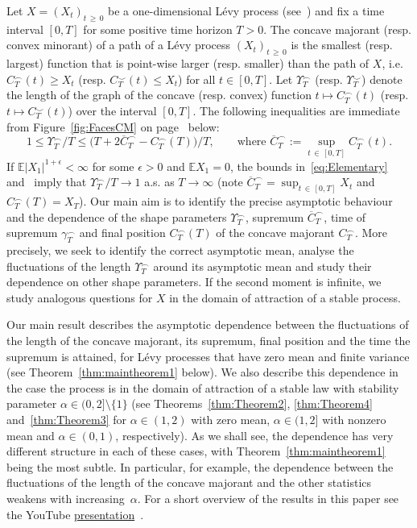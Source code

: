 \documentclass[10pt]{amsart}
\theoremstyle{definition}\newtheorem{defi}[theo]{Definition}\newtheorem{rema}[theo]{Remark}\newtheorem{exam}[theo]{Example}\newtheorem{exem}[theo]{Example}\newtheorem{nota}[theo]{Notation}
\newcommand\E{\mathds{E}}
\newcommand\1{\mathds{1}}
\newcommand\ov[1]{\overline{#1}}
\begin{document}
Let $X=(X_t)_{t\,\ge\,0}$ be a one-dimensional Lévy process (see~\cite[Definition~1.6, Chapter~1]{SatoBookLevy}) and fix a time interval $[0,T]$ for some positive time horizon $T>0$. The concave majorant (resp. convex minorant) of a path of a Lévy process $(X_t)_{t\,\geq\,0}$ is the smallest (resp. largest) function that is point-wise larger (resp. smaller) than the path of $X$, i.e. $C^{\frown}_T(t) \geq X_t$ (resp. $C^{\smile}_T(t) \leq X_t$) for all $t\in [0,T]$. Let $\Upsilon_T^{\frown}$ (resp. $\Upsilon_T^{\smile}$) denote the length of the graph of the concave (resp. convex) function $t\mapsto C^{\frown}_T(t)$ (resp. $t\mapsto C^{\smile}_T(t)$) over the interval $[0,T]$. The following inequalities are immediate from Figure~\ref{fig:FacesCM} on page~\pageref{page:Fig_2} below:
\begin{equation}\label{eq:Elementary}
1\le\Upsilon_T^{\frown}/T
\le\Big(T+2
\ov{C}^\frown_T- C^\frown_T(T)\Big)/T, \qquad\text{where }\ov{C}^\frown_T:=\sup_{t\,\in\,[0,T]}C^{\frown}_T(t).
\end{equation}
If $\E|X_1|^{1+\epsilon}<\infty$ for some $\epsilon>0$ and $\E X_1=0$, the bounds in~\eqref{eq:Elementary} and~\cite[Proposition~48.10]{SatoBookLevy} imply that $\Upsilon_T^{\frown}/T\to1$ a.s. as $T\to\infty$ (note $\ov{C}^\frown_T=\sup_{t\,\in\,[0,T]}X_t$ and $C^\frown_T(T)=X_T$). Our main aim is to identify the precise asymptotic behaviour and the dependence of the shape parameters $\Upsilon_T^\frown$, supremum $\ov{C}^\frown_T$, time of supremum $\gamma^\frown_T$ and final position $C^\frown_T(T)$ of the concave majorant $C^{\frown}_T$. More precisely, we seek to identify the correct asymptotic mean, analyse the fluctuations of the length $\Upsilon_T^\frown$ around its asymptotic mean and study their dependence on other shape parameters. If the second moment is infinite, we study analogous questions for $X$ in the domain of attraction of a stable process.

Our main result describes the asymptotic dependence between the fluctuations of the length of the concave majorant, its supremum, final position and the time the supremum is attained, for Lévy processes that have zero mean and finite variance (see Theorem~\ref{thm:maintheorem1} below). We also describe this dependence in the case the process is in the domain of attraction of a stable law with stability parameter $\alpha\in(0,2]\setminus\{1\}$ (see Theorems~\ref{thm:Theorem2}, \ref{thm:Theorem4} and~\ref{thm:Theorem3} for $\alpha\in(1,2)$ with zero mean, $\alpha\in(1,2]$ with nonzero mean and $\alpha\in(0,1)$, respectively). As we shall see, the dependence has very different structure in each of these cases, with Theorem~\ref{thm:maintheorem1} being the most subtle. In particular, for example, the dependence between the fluctuations of the length of the concave majorant and the other statistics weakens with increasing~$\alpha$. For a short overview of the results in this paper see the YouTube \href{https://youtu.be/b0AOJm-dE3g}{presentation}~\cite{Presentation_DB}.
\end{document}
